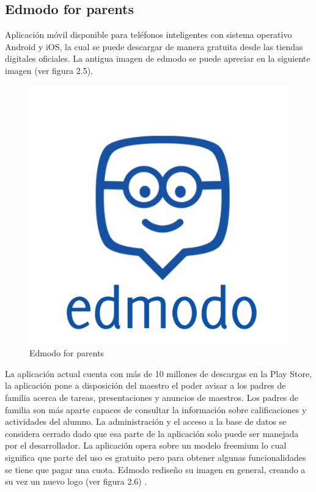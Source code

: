         \subsection{Edmodo for parents}
        
            Aplicación móvil disponible para teléfonos inteligentes con sistema operativo Android y iOS, la cual se puede descargar de manera gratuita desde las tiendas digitales oficiales. La antigua imagen de edmodo se puede apreciar en la siguiente imagen (ver figura 2.5).
        
            \begin{figure}[H]
                \centering
                \includegraphics[scale=0.2]{Propuesta_Plantilla_Tesis_LaTeX_UAG/imagenes/edmodo.jpeg}
                \caption{Edmodo for parents}
                \label{fig:edmodo}
            \end{figure}
        
            La aplicación actual cuenta con más de 10 millones de descargas en la Play Store, la aplicación pone a disposición del maestro el poder avisar a los padres de familia acerca de tareas, presentaciones y anuncios de maestros. Los padres de familia son más aparte capaces de consultar la información sobre calificaciones y actividades del alumno. La administración y el acceso a la base de datos se considera cerrado dado que esa parte de la aplicación solo puede ser manejada por el desarrollador. La aplicación opera sobre un modelo freemium lo cual significa que parte del uso es gratuito pero para obtener algunas funcionalidades se tiene que pagar una cuota. Edmodo rediseño su imagen en general, creando a su vez un nuevo logo (ver figura 2.6) \cite{edmodo}.
        
